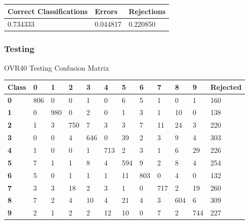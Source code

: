 \documentclass[
  a4paper,            %
  DIV=10,             %
  oneside,            %
  BCOR=5mm,           %
  parskip=half,       %
  numbers=noenddot,   %
  bibtotoc,           %
  listof=totoc,        %
  article
]{scrreprt}
\begin{document}
\begin{center}
  \begin{tabular}{|p{5cm}|p{3cm}|p{3cm}|}
    \hline
    \textbf{Correct Classifications} & \textbf{Errors} & \textbf{Rejections} \\
    \hline
    0.734333 & 0.044817 & 0.220850 \\
    \hline
  \end{tabular}
\end{center}
\subsubsection{Testing}
\begin{center}
  \small{OVR40 Testing Confusion Matrix}
  \begin{tabular}{|p{1cm}|p{1cm}|p{1cm}|p{1cm}|p{1cm}|p{1cm}|p{1cm}|p{1cm}|p{1cm}|p{1cm}|p{1cm}|p{1.7cm}|}
    \hline
    \textbf{Class} & \textbf{0} & \textbf{1} & \textbf{2} & \textbf{3} & \textbf{4} & \textbf{5} & \textbf{6} & \textbf{7} & \textbf{8} & \textbf{9} & \textbf{Rejected} \\
    \hline
    \textbf{0} & 806 & 0 & 0 & 1 & 0 & 6 & 5 & 1 & 0 & 1 & 160 \\
    \hline
    \textbf{1} & 0 & 980 & 0 & 2 & 0 & 1 & 3 & 1 & 10 & 0 & 138 \\
    \hline
    \textbf{2} & 1 & 3 & 750 & 7 & 3 & 3 & 7 & 11 & 24 & 3 & 220 \\
    \hline
    \textbf{3} & 0 & 0 & 4 & 646 & 0 & 39 & 2 & 3 & 9 & 4 & 303 \\
    \hline
    \textbf{4} & 1 & 0 & 0 & 1 & 713 & 2 & 3 & 1 & 6 & 29 & 226 \\
    \hline
    \textbf{5} & 7 & 1 & 1 & 8 & 4 & 594 & 9 & 2 & 8 & 4 & 254 \\
    \hline
    \textbf{6} & 5 & 0 & 1 & 1 & 1 & 11 & 803 & 0 & 4 & 0 & 132 \\
    \hline
    \textbf{7} & 3 & 3 & 18 & 2 & 3 & 1 & 0 & 717 & 2 & 19 & 260 \\
    \hline
    \textbf{8} & 7 & 2 & 4 & 10 & 4 & 21 & 4 & 3 & 604 & 6 & 309 \\
    \hline
    \textbf{9} & 2 & 1 & 2 & 2 & 12 & 10 & 0 & 7 & 2 & 744 & 227 \\
    \hline
  \end{tabular}
\end{center}
\end{document}
